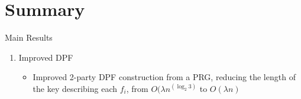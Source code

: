 
\clearpage
{}

%
\setcounter{section}{0} %

\section{Summary}
Main Results
\begin{enumerate}
    \item Improved DPF
    \begin{itemize}
        \item Improved 2-party DPF construction from a PRG, reducing the length of the key describing each $f_i$, from $O(\lambda n^(\log_2 3)$ to $O(\lambda n)$
    \end{itemize}
\end{enumerate}

%
